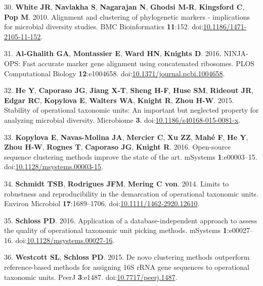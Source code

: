 \documentclass[11pt,]{article}
\begin{document}
\hypertarget{ref-White2010}{}
30. \textbf{White JR}, \textbf{Navlakha S}, \textbf{Nagarajan N},
\textbf{Ghodsi M-R}, \textbf{Kingsford C}, \textbf{Pop M}. 2010.
Alignment and clustering of phylogenetic markers - implications for
microbial diversity studies. BMC Bioinformatics \textbf{11}:152.
doi:\href{https://doi.org/10.1186/1471-2105-11-152}{10.1186/1471-2105-11-152}.

\hypertarget{ref-AlGhalith2016}{}
31. \textbf{Al-Ghalith GA}, \textbf{Montassier E}, \textbf{Ward HN},
\textbf{Knights D}. 2016. NINJA-OPS: Fast accurate marker gene alignment
using concatenated ribosomes. PLOS Computational Biology
\textbf{12}:e1004658.
doi:\href{https://doi.org/10.1371/journal.pcbi.1004658}{10.1371/journal.pcbi.1004658}.

\hypertarget{ref-He2015}{}
32. \textbf{He Y}, \textbf{Caporaso JG}, \textbf{Jiang X-T},
\textbf{Sheng H-F}, \textbf{Huse SM}, \textbf{Rideout JR}, \textbf{Edgar
RC}, \textbf{Kopylova E}, \textbf{Walters WA}, \textbf{Knight R},
\textbf{Zhou H-W}. 2015. Stability of operational taxonomic units: An
important but neglected property for analyzing microbial diversity.
Microbiome \textbf{3}.
doi:\href{https://doi.org/10.1186/s40168-015-0081-x}{10.1186/s40168-015-0081-x}.

\hypertarget{ref-Kopylova2016}{}
33. \textbf{Kopylova E}, \textbf{Navas-Molina JA}, \textbf{Mercier C},
\textbf{Xu ZZ}, \textbf{Mahé F}, \textbf{He Y}, \textbf{Zhou H-W},
\textbf{Rognes T}, \textbf{Caporaso JG}, \textbf{Knight R}. 2016.
Open-source sequence clustering methods improve the state of the art.
mSystems \textbf{1}:e00003--15.
doi:\href{https://doi.org/10.1128/msystems.00003-15}{10.1128/msystems.00003-15}.

\hypertarget{ref-Schmidt2014}{}
34. \textbf{Schmidt TSB}, \textbf{Rodrigues JFM}, \textbf{Mering C von}.
2014. Limits to robustness and reproducibility in the demarcation of
operational taxonomic units. Environ Microbiol \textbf{17}:1689--1706.
doi:\href{https://doi.org/10.1111/1462-2920.12610}{10.1111/1462-2920.12610}.

\hypertarget{ref-Schloss2016a}{}
35. \textbf{Schloss PD}. 2016. Application of a database-independent
approach to assess the quality of operational taxonomic unit picking
methods. mSystems \textbf{1}:e00027--16.
doi:\href{https://doi.org/10.1128/msystems.00027-16}{10.1128/msystems.00027-16}.

\hypertarget{ref-Westcott2015}{}
36. \textbf{Westcott SL}, \textbf{Schloss PD}. 2015. De novo clustering
methods outperform reference-based methods for assigning 16S rRNA gene
sequences to operational taxonomic units. PeerJ \textbf{3}:e1487.
doi:\href{https://doi.org/10.7717/peerj.1487}{10.7717/peerj.1487}.
\end{document}
